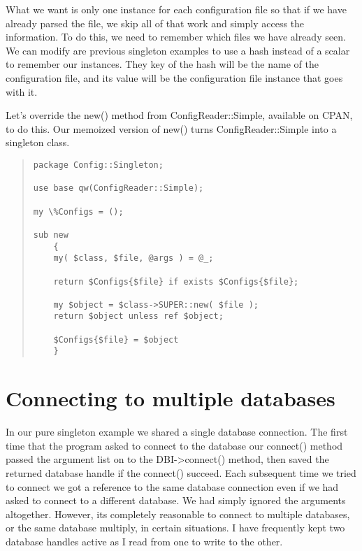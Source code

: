 What we want is only one instance for each configuration file so that
if we have already parsed the file, we skip all of that work and 
simply access the information.  To do this, we need to remember which 
files we have already seen. We can modify are previous singleton
examples to use a hash instead of a scalar to remember our instances.
They key of the hash will be the name of the configuration file, and
its value will be the configuration file instance that goes with it.

Let's override the new() method from ConfigReader::Simple, available
on CPAN, to do this.  Our memoized version of new() turns ConfigReader::Simple
into a singleton class.

\begin{quote}    
\begin{verbatim}
package Config::Singleton;

use base qw(ConfigReader::Simple);

my \%Configs = ();

sub new
    {
    my( $class, $file, @args ) = @_;
    
    return $Configs{$file} if exists $Configs{$file};
    
    my $object = $class->SUPER::new( $file );
    return $object unless ref $object;
    
    $Configs{$file} = $object
    }
\end{verbatim}
\end{quote}
    

    \section{Connecting to multiple databases}
    
In our pure singleton example we shared a single database connection.
The first time that the program asked to connect to the database our
connect() method passed the argument list on to the DBI->connect()
method, then saved the returned database handle if the connect() 
succeed.  Each subsequent time we tried to connect we got a reference
to the same database connection even if we had asked to connect to
a different database.  We had simply ignored the arguments altogether.
However, its completely reasonable  to connect to multiple
databases, or the same database multiply, in certain situations.  I have
frequently kept two database handles active as I read from one to write
to the other.

